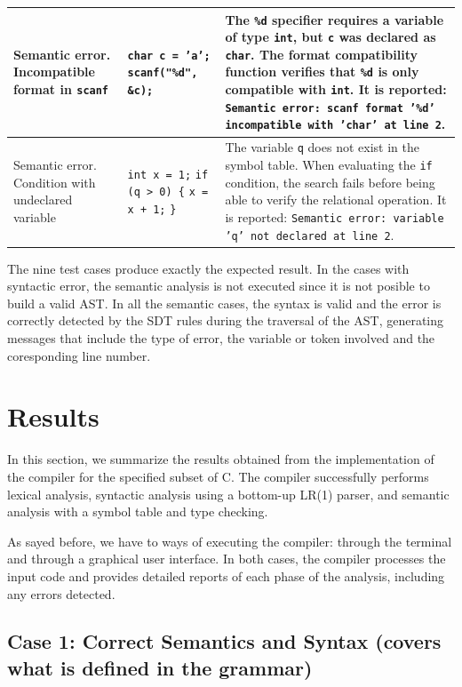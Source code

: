 \documentclass[letterpaper,12pt,oneside]{article}
\begin{document}
\begin{longtable}{|p{3.8cm}|p{3.5cm}|p{6.5cm}|}
\hline
Semantic error. Incompatible format in \texttt{scanf} &
\texttt{char c = 'a';} \newline \texttt{scanf("\%d", \&c);} &
The \texttt{\%d} specifier requires a variable of type \texttt{int}, but \texttt{c} was declared as \texttt{char}. The format compatibility function verifies that \texttt{\%d} is only compatible with \texttt{int}. It is reported: \texttt{Semantic error: scanf format '\%d' incompatible with 'char' at line 2}. \\
\hline
Semantic error. Condition with undeclared variable &
\texttt{int x = 1;} \newline \texttt{if (q > 0) \{} \newline \texttt{\quad x = x + 1;} \newline \texttt{\}} &
The variable \texttt{q} does not exist in the symbol table. When evaluating the \texttt{if} condition, the search fails before being able to verify the relational operation. It is reported: \texttt{Semantic error: variable 'q' not declared at line 2}. \\
\hline
\end{longtable}

The nine test cases produce exactly the expected result. In the cases with syntactic error, the semantic analysis is not executed since it is not posible to build a valid AST. In all the semantic cases, the syntax is valid and the error is correctly detected by the SDT rules during the traversal of the AST, generating messages that include the type of error, the variable or token involved and the coresponding line number.


\newpage
\section{Results}
In this section, we summarize the results obtained from the implementation of the compiler for the specified subset of C. The compiler successfully performs lexical analysis, syntactic analysis using a bottom-up LR(1) parser, and semantic analysis with a symbol table and type checking.

As sayed before, we have to ways of executing the compiler: through the terminal and through a graphical user interface. In both cases, the compiler processes the input code and provides detailed reports of each phase of the analysis, including any errors detected.


\subsection{Case 1: Correct Semantics and Syntax (covers what is defined in the grammar)}
\end{document}
